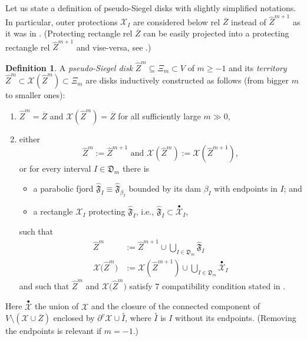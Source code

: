 \documentclass{amsart}
\newcommand{\1}{{\mathbb 1 }}
\newcommand{\upbullet}[1]{\overset{\bullet}{ #1}{}}
\newcommand\XX{\mathcal{X}}
\newcommand{\wZ}{{\widehat Z}}
\theoremstyle{remark}
\numberwithin{equation}{section}
\theoremstyle{definition}
\newtheorem{defn}[thm]{Definition}
\begin{document}
Let us state a definition of pseudo-Siegel disks with slightly simplified notations.  In particular, outer protections $\XX_I$ are considered below rel $\overline Z$ instead of $\widehat Z^{m+1}$ as it was in \cite[Assumption 6]{DL22}. (Protecting rectangle rel $\overline Z$ can be easily projected into a protecting rectangle rel $\wZ^{m+1}$ and vise-versa, see \cite[ Lemma 5.9]{DL22}.) 
\begin{defn}
\label{defn:pseudo-Siegel disks} A \emph{pseudo-Siegel disk} 
$\widehat Z^m \subseteq \Xi_m \subset V$ of $m\ge -1$ and its \emph{territory} $\wZ^m \subset \XX (\wZ^m) \subset \Xi_m$ are disks inductively constructed as follows (from bigger $m$ to smaller ones):
\begin{enumerate}
\item $\widehat Z^m = \overline{Z}$ and $\XX(\widehat Z^m) = \overline{Z}$ for all sufficiently large $m \gg 0$,
\item either \[\widehat Z^m := \widehat Z^{m+1}\text{ and } \XX(\widehat Z^m) := \XX(\widehat Z^{m+1}),\] 
or for every interval $I\in \mathfrak D_m$ there is 
\begin{itemize}
    \item a parabolic fjord $\widehat{\mathfrak F}_I\equiv \widehat{\mathfrak F}_{\beta_I}$ bounded by its dam $\beta_I$ with endpoints in $I$; and
    \item a rectangle $\XX_I$ protecting $\widehat{\mathfrak F}_I$, i.e.,  $\widehat{\mathfrak F}_I\subset \upbullet\XX_I$,
\end{itemize}
 such that    
   \begin{equation}\label{eq:defn:pseudo-Siegel disks}
      \begin{aligned}
     \widehat Z^m &:= \widehat Z^{m+1} \cup \bigcup_{I\in \mathfrak{D}_m} \widehat{\mathfrak F}_{I}\\ 
         \XX \big(\widehat Z^m\big) &:= \XX(\wZ^{m+1})\cup \bigcup_{I\in \mathfrak{D}_m} \upbullet \XX_I 
    \end{aligned}\end{equation}
and such that $\wZ^m$ and $\XX \big(\widehat Z^m\big)$ satisfy $7$ compatibility condition stated in \cite[\S~5.1]{DL22}. 
\end{enumerate}
\end{defn}

Here $\upbullet \XX$ the union of $\XX$ and the closure of the connected component of $V\setminus (\XX\cup \overline Z)$ enclosed by $\partial^v \XX \cup \overset{\circ} {I}$, where $\overset{\circ} {I}$ is $I$ without its endpoints. (Removing the endpoints is relevant if $m=-1$.) 
\end{document}
